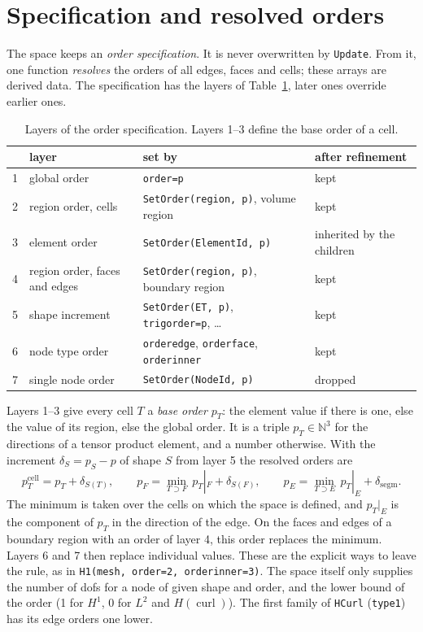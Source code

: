 \documentclass[10pt,a4paper]{article}
\newcommand{\code}[1]{\texttt{#1}}
\begin{document}
\section{Specification and resolved orders}

The space keeps an \emph{order specification}. It is never overwritten by \code{Update}. From it, one function \emph{resolves} the orders of all edges, faces and cells; these arrays are derived data. The specification has the layers of Table~\ref{tab:layers}, later ones override earlier ones.

\begin{table}[h]\centering\small
\begin{tabular}{@{}clll@{}}\toprule
 & layer & set by & after refinement \\\midrule
1 & global order & \code{order=p} & kept \\
2 & region order, cells & \code{SetOrder(region, p)}, volume region & kept \\
3 & element order & \code{SetOrder(ElementId, p)} & inherited by the children \\\midrule
4 & region order, faces and edges & \code{SetOrder(region, p)}, boundary region & kept \\
5 & shape increment & \code{SetOrder(ET, p)}, \code{trigorder=p}, \dots & kept \\
6 & node type order & \code{orderedge}, \code{orderface}, \code{orderinner} & kept \\
7 & single node order & \code{SetOrder(NodeId, p)} & dropped \\\bottomrule
\end{tabular}
\caption{Layers of the order specification. Layers 1--3 define the base order of a cell.}\label{tab:layers}
\end{table}

Layers 1--3 give every cell $T$ a \emph{base order} $p_T$: the element value if there is one, else the value of its region, else the global order. It is a triple $p_T \in \mathbb{N}^3$ for the directions of a tensor product element, and a number otherwise. With the increment $\delta_S = p_S - p$ of shape $S$ from layer 5 the resolved orders are
\begin{equation}\label{eq:rule}
p^{\text{cell}}_T = p_T + \delta_{S(T)}, \qquad
p_F = \min_{T \supset F} \, p_T|_F + \delta_{S(F)}, \qquad
p_E = \min_{T \supset E} \, p_T|_E + \delta_{\text{segm}} .
\end{equation}
The minimum is taken over the cells on which the space is defined, and $p_T|_E$ is the component of $p_T$ in the direction of the edge. On the faces and edges of a boundary region with an order of layer 4, this order replaces the minimum. Layers 6 and 7 then replace individual values. These are the explicit ways to leave the rule, as in \code{H1(mesh, order=2, orderinner=3)}. The space itself only supplies the number of dofs for a node of given shape and order, and the lower bound of the order (1 for $H^1$, 0 for $L^2$ and $H(\operatorname{curl})$). The first family of \code{HCurl} (\code{type1}) has its edge orders one lower.
\end{document}
